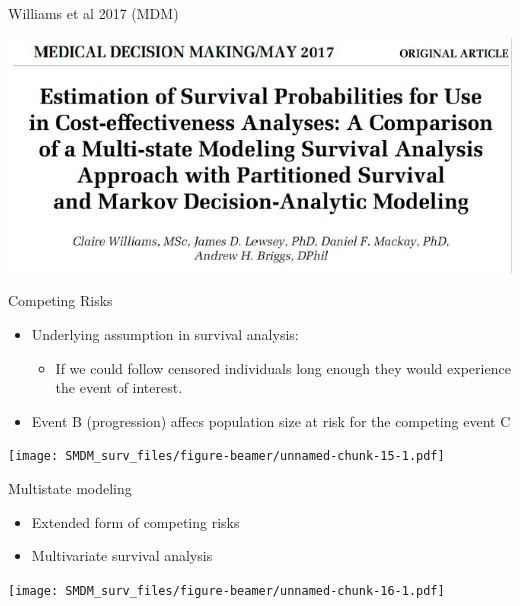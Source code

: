 \documentclass[
  ignorenonframetext,
]{beamer}
\providecommand{\tightlist}{%
  \setlength{\itemsep}{0pt}\setlength{\parskip}{0pt}}
\begin{document}
\begin{frame}

Williams et al 2017 (MDM)

\includegraphics[width=1\linewidth]{figures/williams2017}

\end{frame}

\begin{frame}{Competing Risks}
\protect\hypertarget{competing-risks}{}

\begin{itemize}
\tightlist
\item
  Underlying assumption in survival analysis:

  \begin{itemize}
  \tightlist
  \item
    If we could follow censored individuals long enough they would
    experience the event of interest.
  \end{itemize}
\item
  Event B (progression) affecs population size at risk for the competing
  event C
\end{itemize}

\end{frame}

\begin{frame}

\texttt{[image: SMDM\_surv\_files/figure-beamer/unnamed-chunk-15-1.pdf]}

\end{frame}

\begin{frame}{Multistate modeling}
\protect\hypertarget{multistate-modeling}{}

\begin{itemize}
\tightlist
\item
  Extended form of competing risks
\item
  Multivariate survival analysis
\end{itemize}

\texttt{[image: SMDM\_surv\_files/figure-beamer/unnamed-chunk-16-1.pdf]}

\end{frame}
\end{document}
